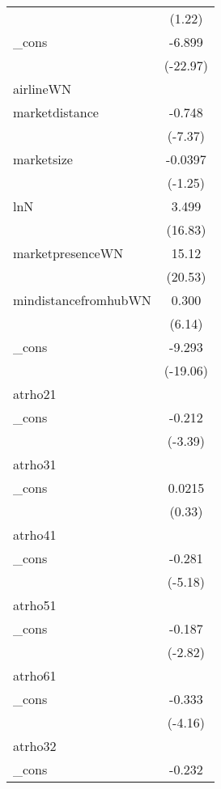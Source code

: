{\begin{tabular}{l*{1}{c}}
            &      (1.22)         \\
[1em]
\_cons      &      -6.899\sym{***}\\
            &    (-22.97)         \\
\hline
airlineWN   &                     \\
marketdistance&      -0.748\sym{***}\\
            &     (-7.37)         \\
[1em]
marketsize  &     -0.0397         \\
            &     (-1.25)         \\
[1em]
lnN         &       3.499\sym{***}\\
            &     (16.83)         \\
[1em]
marketpresenceWN&       15.12\sym{***}\\
            &     (20.53)         \\
[1em]
mindistancefromhubWN&       0.300\sym{***}\\
            &      (6.14)         \\
[1em]
\_cons      &      -9.293\sym{***}\\
            &    (-19.06)         \\
\hline
atrho21     &                     \\
\_cons      &      -0.212\sym{***}\\
            &     (-3.39)         \\
\hline
atrho31     &                     \\
\_cons      &      0.0215         \\
            &      (0.33)         \\
\hline
atrho41     &                     \\
\_cons      &      -0.281\sym{***}\\
            &     (-5.18)         \\
\hline
atrho51     &                     \\
\_cons      &      -0.187\sym{**} \\
            &     (-2.82)         \\
\hline
atrho61     &                     \\
\_cons      &      -0.333\sym{***}\\
            &     (-4.16)         \\
\hline
atrho32     &                     \\
\_cons      &      -0.232\sym{***}\\

\end{tabular}}
